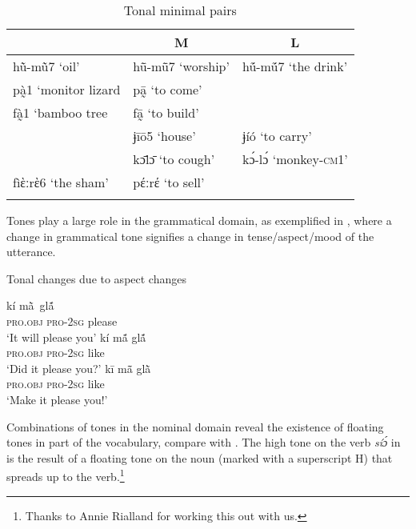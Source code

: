 \documentclass[output=paper]{langscibook}
\begin{document}
\begin{table}
\caption{Tonal minimal pairs\label{tab:traore:minimal_pairs:3}}
\begin{tabular}{lll}
 \lsptoprule
 \multicolumn{1}{c}{H} & \multicolumn{1}{c}{M} & \multicolumn{1}{c}{L} \\\midrule
hũ̀-mũ̀7  ‘oil’ & hũ̄-mũ̄7 ‘worship’ & hṹ-mṹ7  ‘the drink’\\
 pà̰1 ‘monitor lizard & pā̰     ‘to come’ &  \\
 fà̰1 ‘bamboo tree &   fā̰      ‘to build’& \\
  &  ɉīō5  `house’ & ɉíó  ‘to carry’\\
  & kɔ̄lɔ̄   ‘to cough’ &  kɔ́-lɔ́ ‘monkey-\textsc{cm1}’\\
  fìὲːrὲ6  ‘the sham’ & pέːrέ  ‘to sell’ \\\lspbottomrule
\end{tabular}
\end{table}

Tones play a large role in the grammatical domain, as exemplified in , where a change in grammatical tone signifies a change in tense/aspect/mood of the utterance. 

\begin{exe}
    \ex Tonal changes due to aspect changes \label{ex:traore:tonal_change_aspect_change:1}
    \begin{xlist}
     \ex \gll kí              {mã̀ }           glã́ \\
         \textsc{pro}.\textsc{obj}     \textsc{pro}{}-2\textsc{sg}    please\\
         \trans `It will please you'
    \ex \gll  kí               mã́             glã́ \\
            \textsc{pro}.\textsc{obj}     \textsc{pro}{}-2\textsc{sg}   like\\
            \trans `Did it please you?'
    \ex \gll kī              mã̄              glã̀ \\
        \textsc{pro}.\textsc{obj}    \textsc{pro}{}-2\textsc{sg}   like\\
        \trans  `Make it please you!'
    \end{xlist}

\end{exe}

Combinations of tones in the nominal domain reveal the existence of floating tones in part of the vocabulary, compare  with . The high tone on the verb \textit{síɔ́} in  is the result of a floating tone on the noun (marked with a superscript H) that spreads up to the verb.\footnote{Thanks to Annie Rialland for working this out with us.}  
\end{document}
